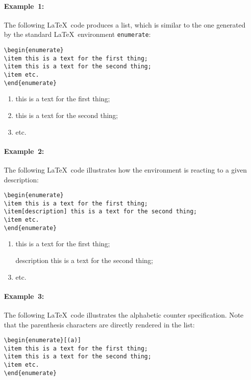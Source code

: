 \documentclass[book]{upmethodology-document}
\begin{document}
\paragraph{Example~1:} The following \LaTeX~code produces a list, which is similar to the one generated by the standard \LaTeX\ environment \texttt{enumerate}:
\begin{verbatim}
\begin{enumerate}
\item this is a text for the first thing;
\item this is a text for the second thing;
\item etc.
\end{enumerate}
\end{verbatim}

\begin{enumerate}
\item this is a text for the first thing;
\item this is a text for the second thing;
\item etc.
\end{enumerate}

\paragraph{Example~2:} The following \LaTeX~code illustrates how the environment is reacting to a given description:
\begin{verbatim}
\begin{enumerate}
\item this is a text for the first thing;
\item[description] this is a text for the second thing;
\item etc.
\end{enumerate}
\end{verbatim}

\begin{enumerate}
\item this is a text for the first thing;
\item[description] this is a text for the second thing;
\item etc.
\end{enumerate}

\paragraph{Example~3:} The following \LaTeX~code illustrates the alphabetic counter specification. Note that the parenthesis characters are directly rendered in the list:
\begin{verbatim}
\begin{enumerate}[(a)]
\item this is a text for the first thing;
\item this is a text for the second thing;
\item etc.
\end{enumerate}
\end{verbatim}
\end{document}
